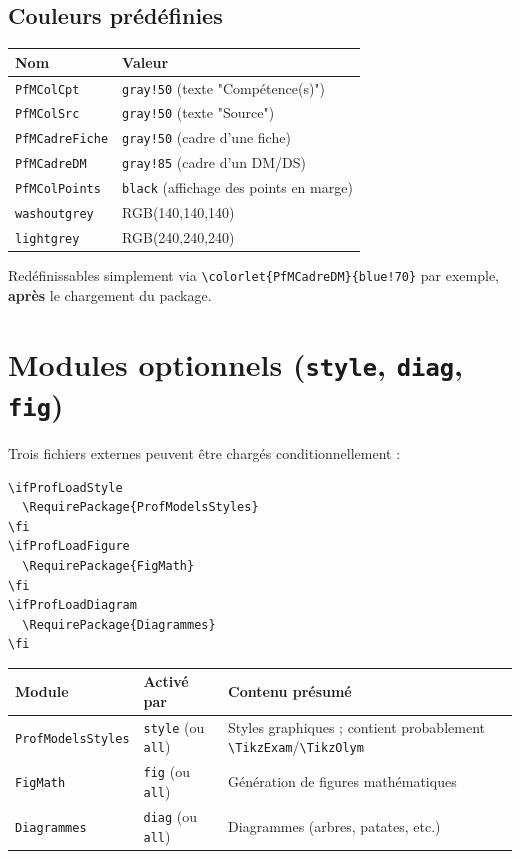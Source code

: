 \documentclass[11pt,a4paper]{article}
\newcommand{\cmdname}[1]{\texttt{\textbackslash#1}}
\begin{document}
\subsection{Couleurs prédéfinies}

\begin{center}
\begin{tabular}{@{}ll@{}}
\toprule
\textbf{Nom} & \textbf{Valeur} \\
\midrule
\texttt{PfMColCpt} & \texttt{gray!50} (texte "Compétence(s)") \\
\texttt{PfMColSrc} & \texttt{gray!50} (texte "Source") \\
\texttt{PfMCadreFiche} & \texttt{gray!50} (cadre d'une fiche) \\
\texttt{PfMCadreDM} & \texttt{gray!85} (cadre d'un DM/DS) \\
\texttt{PfMColPoints} & \texttt{black} (affichage des points en marge) \\
\texttt{washoutgrey} & RGB(140,140,140) \\
\texttt{lightgrey} & RGB(240,240,240) \\
\bottomrule
\end{tabular}
\end{center}

Redéfinissables simplement via \texttt{\textbackslash colorlet\{PfMCadreDM\}\{blue!70\}} par exemple, \textbf{après} le chargement du package.

\section{Modules optionnels (\texttt{style}, \texttt{diag}, \texttt{fig})}

Trois fichiers externes peuvent être chargés conditionnellement :

\begin{lstlisting}
\ifProfLoadStyle
  \RequirePackage{ProfModelsStyles}
\fi
\ifProfLoadFigure
  \RequirePackage{FigMath}
\fi
\ifProfLoadDiagram
  \RequirePackage{Diagrammes}
\fi
\end{lstlisting}

\begin{center}
\begin{tabular}{@{}lll@{}}
\toprule
\textbf{Module} & \textbf{Activé par} & \textbf{Contenu présumé} \\
\midrule
\texttt{ProfModelsStyles} & \texttt{style} (ou \texttt{all}) & Styles graphiques ; contient probablement \cmdname{TikzExam}/\cmdname{TikzOlym} \\
\texttt{FigMath} & \texttt{fig} (ou \texttt{all}) & Génération de figures mathématiques \\
\texttt{Diagrammes} & \texttt{diag} (ou \texttt{all}) & Diagrammes (arbres, patates, etc.) \\
\bottomrule
\end{tabular}
\end{center}
\end{document}
